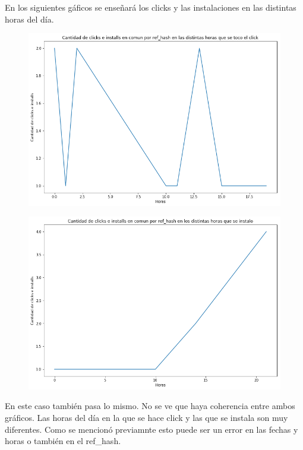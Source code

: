 \documentclass[a4paper, 12pt]{article}
\begin{document}
{{	En los siguientes gáficos se enseñará los clicks y las instalaciones en las distintas horas del día.
	
	\FloatBarrier
		\begin{figure}[H]
			\centering
			\includegraphics[width=\textwidth]{images/clicks-installs/hours_clicks.png}
			\caption{}
		\end{figure}
	
	
	
		\begin{figure}[h]
			\centering
			\includegraphics[width=\textwidth]{images/clicks-installs/hours_installs.png}
			\caption{}
		\end{figure}
	\FloatBarrier


	En este caso también pasa lo mismo. No se ve que haya coherencia entre ambos gráficos. Las horas del día en la que se hace click y las que se instala son muy diferentes. Como se mencionó previamnte esto puede ser un error en las fechas y horas o también en el ref\_hash.
	

}}
\end{document}
